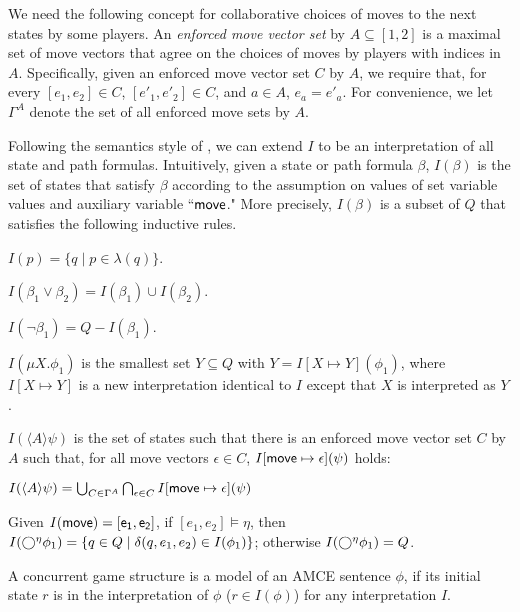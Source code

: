 We need the following concept for collaborative choices of moves 
to the next states by some players. 
An {\em enforced move vector set} by $A\subseteq [1,2]$ is 
a maximal set of move vectors that agree on the choices of moves 
by players with indices in $A$. 
Specifically, given an enforced move vector set $C$ by $A$, 
we require that, for every $[e_1,e_2]\in C$,  
$[e'_1,e'_2]\in C$, and $a\in A$, $e_a=e'_a$.  
For convenience, we let $\Gamma^A$ denote the set of all 
enforced move sets by $A$.  

Following the semantics style of \cite{AHK02}, 
we can extend $I$ to be an interpretation of all state and path formulas.  
Intuitively, given a state or path formula $\beta$, 
$I(\beta)$ is the set of states that satisfy $\beta$ according to
the assumption on values of set variable values and auxiliary 
variable ``$\sf move$."
More precisely, 
$I(\beta)$ is a subset of $Q$ 
that satisfies the following inductive rules. 
\begin{list1} 
\item $I(p)=\{q\mid p\in \lambda(q)\}$. 
\item $I(\beta_1\vee\beta_2)=I(\beta_1)\cup I(\beta_2)$. 
\item $I(\neg\beta_1)=Q-I(\beta_1)$.

\item $I(\mu X.\phi_1)$ is the smallest set $Y\subseteq Q$ 
  with $Y=I[X\mapsto Y](\phi_1)$, where 
  $I[X\mapsto Y]$ is a new interpretation identical to $I$ 
  except that $X$ is interpreted as $Y$.

\item $I(\langle A\rangle \psi)$ is the set of states 
such that there is an enforced move vector set $C$ by $A$ such that, for all move vectors $\epsilon \in C$,  
  $I[\sf move\mapsto \epsilon](\psi)$ holds:
  \begin{center} 
  $I(\langle A\rangle \psi) = 
  \bigcup_{C \in\Gamma^A}
  \bigcap_{\epsilon \in C} I[\sf move\mapsto \epsilon](\psi)$ 
  \end{center} 
\item Given $I(\sf move)=[e_1,e_2]$, 
  if $[e_1,e_2]\models \eta$, then  
$I(\bigcirc^\eta \phi_1) = \{q \in Q \mid \delta(q,e_1,e_2) \in I(\phi_1)\}$; 
otherwise $I(\bigcirc^\eta \phi_1) = Q$.  

\end{list1} 
A concurrent game structure is a model of an AMCE sentence $\phi$, if its initial state $r$ is in the interpretation of $\phi$ ($r \in I(\phi)$) for any interpretation $I$.

